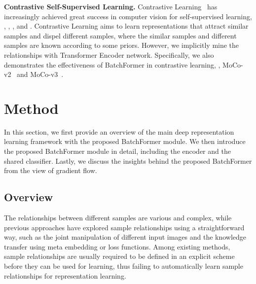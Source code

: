 \documentclass[10pt,twocolumn,letterpaper]{article}
\begin{document}
{\bf Contrastive Self-Supervised Learning.}
Contrastive Learning~\cite{hadsell2006dimensionality} has increasingly achieved great success in computer vision for self-supervised learning, \eg, \cite{oord2018representation}, \cite{hjelm2018learning}, \cite{he2019moco, chen2020mocov2, chen2021mocov3} and \cite{chen2020simple}. Contrastive Learning aims to learn representations that attract similar samples and dispel different samples, where the similar samples and different samples are known according to some priors. However, we implicitly mine the relationships with Transformer Encoder network. Specifically, we also demonstrates the effectiveness of BatchFormer in contrastive learning, \eg, MoCo-v2~\cite{chen2020mocov2} and MoCo-v3~\cite{chen2021mocov3}.














\section{Method}

In this section, we first provide an overview of the main deep representation learning framework with the proposed BatchFormer module. We then introduce the proposed BatchFormer module in detail, including the encoder and the shared classifier. Lastly, we discuss the insights behind the proposed BatchFormer from the view of gradient flow.

\subsection{Overview}

The relationships between different samples are various and complex, while previous approaches have explored sample relationships using a straightforward way, such as the joint manipulation of different input images and the knowledge transfer using meta embedding or loss functions. Among existing methods, sample relationships are usually required to be defined in an explicit scheme before they can be used for learning, thus failing to automatically learn sample relationships for representation learning.
\end{document}
